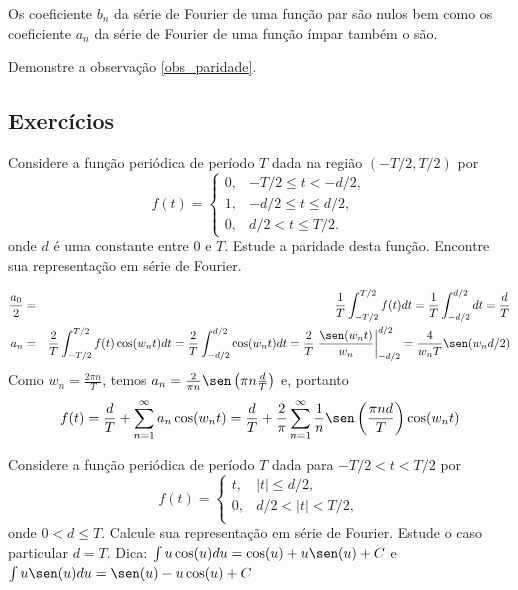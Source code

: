 \begin{obs}{\label{obs_paridade}} Os coeficiente $b_n$ da série de Fourier de uma função par são nulos bem como os coeficiente $a_n$ da série de Fourier de uma função ímpar também o são.
\end{obs}
\begin{ex}Demonstre a observação \ref{obs_paridade}.
\end{ex}
\subsection*{Exercícios}

 \begin{exer}
Considere a função periódica de período $T$ dada na região $(-T/2,T/2)$ por
\begin{equation}f(t)=\left\{
\begin{array}{lc}
0,&-T/2\leq t < -d/2,\\
1,&-d/2\leq t \leq d/2,\\
0,&d/2 < t \leq T/2.
\end{array}
\right.
\end{equation}
onde $d$ é uma constante entre $0$ e $T$.
Estude a paridade desta função. Encontre sua representação em série de Fourier.
\end{exer}
\begin{resp}
\begin{eqnarray*} \frac{a_0}{2}&=&\frac{1}{T}\int_{-T/2}^{T/2}f(t)dt=\frac{1}{T}\int_{-d/2}^{d/2}dt=\frac{d}{T}\\
a_n&=&\frac{2}{T}\int_{-T/2}^{T/2}f(t)\cos(w_nt)dt=\frac{2}{T}\int_{-d/2}^{d/2}\cos(w_nt)dt=\frac{2}{T}\left.\frac{\sen(w_nt)}{w_n}\right|_{-d/2}^{d/2}=\frac{4}{w_nT}\sen(w_nd/2)
\end{eqnarray*}
Como
$w_n=\frac{2\pi n}{T}$, temos $ a_n=\frac{2}{\pi n}\sen\left(\pi n\frac{d}{T}\right)$ e, portanto
\begin{equation}f(t)=\frac{d}{T}+\sum_{n=1}^\infty a_n \cos(w_n t)=\frac{d}{T}+\frac{2}{\pi}\sum_{n=1}^\infty \frac{1}{n}\sen\left(\frac{\pi n d}{T}\right) \cos(w_n t)\end{equation}
\end{resp}
\begin{exer}Considere a função periódica de período $T$ dada para $-T/2<t<T/2$ por
\begin{equation}f(t)=\left\{
\begin{array}{lc}
t,&|t|\leq d/2,\\
0,&d/2<|t|<T/2,\\
\end{array}
\right.
\end{equation}
onde $0<d\leq T$. Calcule sua representação em série de Fourier. Estude o caso particular $d=T$. Dica: $\int u\cos(u)du=\cos(u)+u\sen(u)+C$ e $\int u\sen(u)du=\sen(u)-u\cos(u)+C$
 \end{exer}
